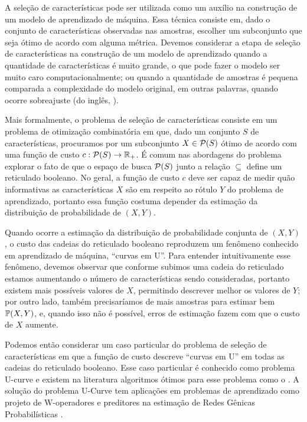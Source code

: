
A seleção de características pode ser utilizada como um auxílio na
construção de um modelo de aprendizado de máquina. Essa técnica consiste
em, dado o conjunto de características observadas nas amostras, escolher
um subconjunto que seja ótimo de acordo com alguma métrica. Devemos 
considerar a etapa de seleção de características na construção de um 
modelo de aprendizado quando a quantidade de características é muito
grande, o que pode fazer o modelo ser muito caro computacionalmente; ou
quando a quantidade de amostras é pequena comparada a complexidade do 
modelo original, em outras palavras, quando ocorre sobreajuste (do 
inglês, ).

Mais formalmente, o problema de seleção de características consiste em
um problema de otimização combinatória em que, dado um conjunto $S$ de 
características, procuramos por um subconjunto $X \in \mathcal{P} (S)$
ótimo de acordo com uma função de custo $c : \mathcal{P}(S) \to 
\mathbb{R}_{+}$. É comum nas abordagens do problema explorar o fato de que
o espaço de busca $\mathcal{P}(S)$ junto a relação $\subseteq$ define um
reticulado booleano. No geral, a função de custo $c$ deve ser capaz de
medir quão informativas as características $X$ são em respeito ao rótulo
$Y$ do problema de aprendizado, portanto essa função costuma depender da
estimação da distribuição de probabilidade de $(X, Y)$.

Quando ocorre a estimação da distribuição de probabilidade conjunta de 
$(X, Y)$, o custo das cadeias do reticulado booleano reproduzem um
fenômeno conhecido em aprendizado de máquina, ``curvas em U''. Para 
entender intuitivamente esse fenômeno, devemos observar que conforme 
subimos uma cadeia do reticulado estamos aumentando o número de 
características sendo consideradas, portanto existem mais possíveis
valores de $X$, permitindo descrever melhor os valores de $Y$; por outro
lado, também precisaríamos de mais amostras para estimar bem 
$\mathbb{P} (X, Y)$, e, quando isso não é possível, erros de estimação
fazem com que o custo de $X$ aumente.

Podemos então considerar um caso particular do problema de seleção de
características em que a função de custo descreve ``curvas em U''
em todas as cadeias do reticulado booleano. Esse caso particular é 
conhecido como problema U-curve e existem na literatura algoritmos 
ótimos para esse problema como o . A solução do 
problema U-Curve tem aplicações em problemas de aprendizado como projeto
de W-operadores \cite{MJCJJB} e preditores na estimação de Redes Gênicas 
Probabilísticas \cite{BCJMJ07}.

